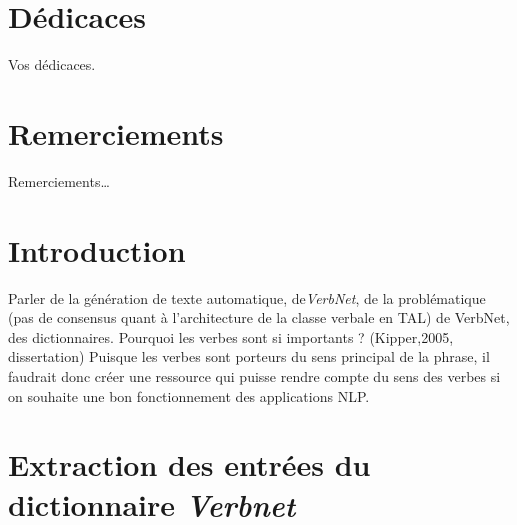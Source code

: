 \documentclass[12pt,maitrise,frenchb,natbib,twoside,initial]{dms}
\numberwithin{equation}{section}
\numberwithin{table}{chapter}
\numberwithin{figure}{chapter}
\begin{document}
\chapter*{Dédicaces}

\vspace{2cm}
\hspace{2.5cm}Vos dédicaces.

\chapter*{Remerciements}

\noindent Remerciements\dots


\NoChapterPageNumber 


\chapter*{Introduction}
\noindent Parler de la génération de texte automatique, de\emph{VerbNet}, de la problématique (pas de consensus quant à l'architecture de la classe verbale en TAL) de VerbNet, des dictionnaires. Pourquoi les verbes sont si importants ? (Kipper,2005, dissertation) Puisque les verbes sont porteurs du sens principal de la phrase, il faudrait donc créer une ressource qui puisse rendre compte du sens des verbes si on souhaite une bon fonctionnement des applications NLP.



\chapter{Extraction des entrées du dictionnaire \emph{Verbnet}}
\end{document}
